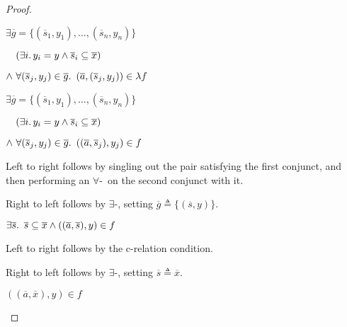 \begin{prop}
\begin{proof}
\begin{itemize}
      \step[\iffs]
        $\exists\overline{g} = \{(\overline{s}_1,y_1),\ldots,(\overline{s}_n,y_n)\}$

      \addtolength{\itemsep}{-.2\baselineskip}
      \step
        \quad$\phantom{\land}~(\exists i\ldotp y_i=y\land\overline{s}_i\subseteq\overline{x})$

      \step
        \quad$\land~\forall(\overline{s}_j,y_j)\in\overline{g}\ldotp~(\overline{a},(\overline{s}_j, y_j))\in\lambda f$

      \addtolength{\itemsep}{.2\baselineskip}

      \step[\iffs]
        $\exists\overline{g} = \{(\overline{s}_1,y_1),\ldots,(\overline{s}_n,y_n)\}$

      \addtolength{\itemsep}{-.2\baselineskip}
      \step
        \quad$\phantom{\land}~(\exists i\ldotp y_i=y\land\overline{s}_i\subseteq\overline{x})$

      \step
        \quad$\land~\forall(\overline{s}_j,y_j)\in\overline{g}\ldotp~((\overline{a},\overline{s}_j), y_j)\in f$
        \marginnote{\Def-$\lambda\cdot$}

      \addtolength{\itemsep}{.2\baselineskip}

      \step
        Left to right follows by singling out the pair satisfying the first conjunct, and then performing an $\forall$-\Elim~on the second conjunct with it.

      \step
        Right to left follows by $\exists$-\Intro, setting $\overline{g}\triangleq\{(\overline{s},y)\}$.

      \step[\iffs]
        $\exists\overline{s}\ldotp~\overline{s}\subseteq\overline{x}\land((\overline{a},\overline{s}),y)\in f$

      \step
        Left to right follows by the c-relation condition.

      \step
        Right to left follows by $\exists$-\Intro, setting $\overline{s}\triangleq\overline{x}$.

      \step[\iffs]
        $((\overline{a},\overline{x}),y)\in f$
        \qedhere
    \end{itemize}
  \end{proof}
\end{prop}


